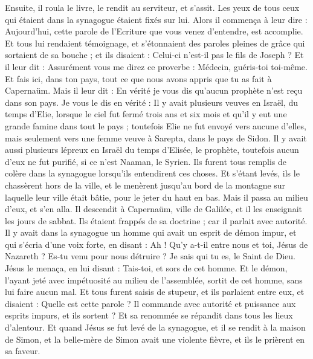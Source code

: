\begin{multicols}{2}
Ensuite, il roula le livre, le rendit au serviteur, et s'assit. Les yeux de tous ceux qui étaient dans la synagogue étaient fixés sur lui.
Alors il commença à leur dire : Aujourd'hui, cette parole de l'Ecriture que vous venez d'entendre, est accomplie.
Et tous lui rendaient témoignage, et s'étonnaient des paroles pleines de grâce qui sortaient de sa bouche ; et ils disaient : Celui-ci n'est-il pas le fils de Joseph ?
Et il leur dit : Assurément vous me direz ce proverbe : Médecin, guéris-toi toi-même. Et fais ici, dans ton pays, tout ce que nous avons appris que tu as fait à Capernaüm.
Mais il leur dit : En vérité je vous dis qu’aucun prophète n'est reçu dans son pays.
Je vous le dis en vérité : Il y avait plusieurs veuves en Israël, du temps d'Elie, lorsque le ciel fut fermé trois ans et six mois et qu'il y eut une grande famine dans tout le pays ;
toutefois Elie ne fut envoyé vers aucune d'elles, mais seulement vers une femme veuve à Sarepta, dans le pays de Sidon.
Il y avait aussi plusieurs lépreux en Israël du temps d'Elisée, le prophète, toutefois aucun d'eux ne fut purifié, si ce n'est Naaman, le Syrien.
Ils furent tous remplis de colère dans la synagogue lorsqu'ils entendirent ces choses.
Et s'étant levés, ils le chassèrent hors de la ville, et le menèrent jusqu'au bord de la montagne sur laquelle leur ville était bâtie, pour le jeter du haut en bas.
Mais il passa au milieu d'eux, et s'en alla.
Il descendit à Capernaüm, ville de Galilée, et il les enseignait les jours de sabbat.
Ils étaient frappés de sa doctrine ; car il parlait avec autorité.
Il y avait dans la synagogue un homme qui avait un esprit de démon impur, et qui s'écria d'une voix forte,
en disant : Ah ! Qu'y a-t-il entre nous et toi, Jésus de Nazareth ? Es-tu venu pour nous détruire ? Je sais qui tu es, le Saint de Dieu.
Jésus le menaça, en lui disant : Tais-toi, et sors de cet homme. Et le démon, l'ayant jeté avec impétuosité au milieu de l'assemblée, sortit de cet homme, sans lui faire aucun mal.
Et tous furent saisis de stupeur, et ils parlaient entre eux, et disaient : Quelle est cette parole ? Il commande avec autorité et puissance aux esprits impurs, et ils sortent ?
Et sa renommée se répandit dans tous les lieux d'alentour.
Et quand Jésus se fut levé de la synagogue, et il se rendit à la maison de Simon, et la belle-mère de Simon avait une violente fièvre, et ils le prièrent en sa faveur.

\end{multicols}
